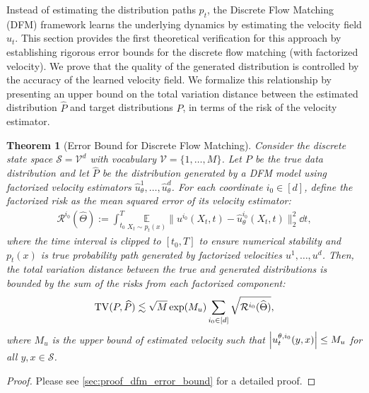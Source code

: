 \documentclass[12pt]{article}
\numberwithin{equation}{section}
\let\hat\widehat
\newcommand{\wh}{\widehat}
\renewcommand{\hat}{\wh}
\DeclareMathOperator*{\E}{{\mathbb{E}}}
\def\E{\mathbb{E}}
\let\cite\citep
\theoremstyle{theoremstyle}
\newtheorem{theorem}{Theorem}[section]
\numberwithin{equation}{section}
\numberwithin{theorem}{section}
\numberwithin{proposition}{section}
\numberwithin{definition}{section}
\numberwithin{lemma}{section}
\numberwithin{assumption}{section}
\numberwithin{remark}{section}
\begin{document}

Instead of estimating the distribution paths $p_t$, the Discrete Flow Matching (DFM) framework \cite{campbell2024generative,gat2024discrete}   learns the underlying dynamics by estimating the velocity field $u_t$. 
This section provides the first theoretical verification for this approach by establishing rigorous error bounds for the discrete flow matching (with factorized velocity).
We prove that the quality of the generated distribution is controlled by the accuracy of the learned velocity field. 
We formalize this relationship by presenting an upper bound on the total variation distance between the estimated distribution $\hat{P}$ and target distributions $P$, in terms of the risk of the velocity estimator.

\begin{theorem}[Error Bound for Discrete Flow Matching]
\label{thm:error_bound_dfm}
Consider the discrete state space $\mathcal{S} = \mathcal{V}^d$ with vocabulary $\mathcal{V} = \{1, \ldots, M\}$. 
Let $P$ be the true data distribution and let $\hat{P}$ be the distribution generated by a DFM model using factorized velocity estimators $\hat{u}_\theta^1, \ldots, \hat{u}_\theta^d$.
For each coordinate $i_0 \in [d]$, define the factorized risk as the mean squared error of its velocity estimator:
\begin{align*}
    \mathcal{R}^{i_0}(\hat{\Theta}) 
    := \int_{t_0}^T \underset{X_t\sim p_t(x)}
    {\E}\|u^{i_0}(X_t,t) - \hat{u}^{i_0}_\theta(X_t,t)\|_2^2 \dd t,
\end{align*}
where the time interval is clipped to $[t_0, T]$ to ensure numerical stability and $p_t(x)$ is true probability path generated by factorized velocities $u^1, \ldots, u^d$. Then, the total variation distance between the true and generated distributions is bounded by the sum of the risks from each factorized component:
\begin{align*}
    {\rm TV}(P,\hat{P})
    \lesssim 
    \sqrt{M} \exp(M_u) 
    \sum_{i_0 \in [d]} \sqrt{\mathcal{R}^{i_0}(\hat{\Theta})},
\end{align*}
where $M_u$ is the upper bound of estimated velocity such that $\abs{u_t^{\theta,i_0}(y,x)} \leq M_u$ for all $y,x \in \mathcal{S}$.
\end{theorem}
    
\begin{proof}
    Please see \cref{sec:proof_dfm_error_bound} for a detailed proof.
\end{proof}
\end{document}
